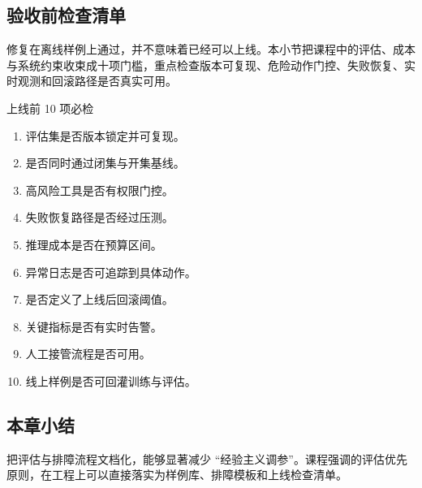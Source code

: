 \subsection{验收前检查清单}
修复在离线样例上通过，并不意味着已经可以上线。本小节把课程中的评估、成本与系统约束收束成十项门槛，重点检查版本可复现、危险动作门控、失败恢复、实时观测和回滚路径是否真实可用。
\begin{importantbox}{上线前 10 项必检}
\begin{enumerate}
    \item 评估集是否版本锁定并可复现。
    \item 是否同时通过闭集与开集基线。
    \item 高风险工具是否有权限门控。
    \item 失败恢复路径是否经过压测。
    \item 推理成本是否在预算区间。
    \item 异常日志是否可追踪到具体动作。
    \item 是否定义了上线后回滚阈值。
    \item 关键指标是否有实时告警。
    \item 人工接管流程是否可用。
    \item 线上样例是否可回灌训练与评估。
\end{enumerate}
\end{importantbox}

\subsection{本章小结}
把评估与排障流程文档化，能够显著减少 ``经验主义调参''。课程强调的评估优先原则，在工程上可以直接落实为样例库、排障模板和上线检查清单。


